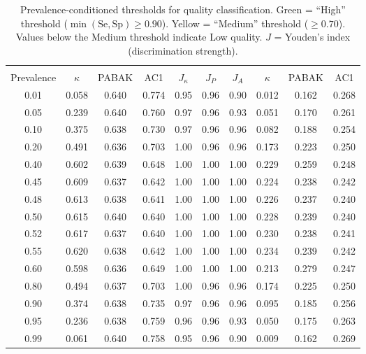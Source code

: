 
\begin{table}[h!]
\centering
\caption{Prevalence-conditioned thresholds for quality classification. \colorbox{green!15}{Green} = ``High'' threshold ($\min(\text{Se}, \text{Sp}) \geq 0.90$). \colorbox{yellow!25}{Yellow} = ``Medium'' threshold ($\geq 0.70$). Values below the Medium threshold indicate Low quality. $J$ = Youden's index (discrimination strength).}
\label{tab:thresholds}
\small
\begin{tabular}{c >{\columncolor{green!10}}c c >{\columncolor{green!10}}c c >{\columncolor{green!10}}c c >{\columncolor{yellow!15}}c >{\columncolor{yellow!15}}c >{\columncolor{yellow!15}}c}
\toprule
 & \multicolumn{3}{c}{High threshold} & \multicolumn{3}{c}{} & \multicolumn{3}{c}{Medium threshold} \\
\cmidrule(lr){2-4} \cmidrule(lr){8-10}
Prevalence & $\kappa$ & PABAK & AC1 & $J_\kappa$ & $J_P$ & $J_A$ & $\kappa$ & PABAK & AC1 \\
\midrule
0.01 & 0.058 & 0.640 & 0.774 & 0.95 & 0.96 & 0.90 & 0.012 & 0.162 & 0.268 \\
0.05 & 0.239 & 0.640 & 0.760 & 0.97 & 0.96 & 0.93 & 0.051 & 0.170 & 0.261 \\
0.10 & 0.375 & 0.638 & 0.730 & 0.97 & 0.96 & 0.96 & 0.082 & 0.188 & 0.254 \\
0.20 & 0.491 & 0.636 & 0.703 & 1.00 & 0.96 & 0.96 & 0.173 & 0.223 & 0.250 \\
0.40 & 0.602 & 0.639 & 0.648 & 1.00 & 1.00 & 1.00 & 0.229 & 0.259 & 0.248 \\
0.45 & 0.609 & 0.637 & 0.642 & 1.00 & 1.00 & 1.00 & 0.224 & 0.238 & 0.242 \\
0.48 & 0.613 & 0.638 & 0.641 & 1.00 & 1.00 & 1.00 & 0.226 & 0.237 & 0.240 \\
0.50 & 0.615 & 0.640 & 0.640 & 1.00 & 1.00 & 1.00 & 0.228 & 0.239 & 0.240 \\
0.52 & 0.617 & 0.637 & 0.640 & 1.00 & 1.00 & 1.00 & 0.230 & 0.238 & 0.241 \\
0.55 & 0.620 & 0.638 & 0.642 & 1.00 & 1.00 & 1.00 & 0.234 & 0.239 & 0.242 \\
0.60 & 0.598 & 0.636 & 0.649 & 1.00 & 1.00 & 1.00 & 0.213 & 0.279 & 0.247 \\
0.80 & 0.494 & 0.637 & 0.703 & 1.00 & 0.96 & 0.96 & 0.174 & 0.225 & 0.250 \\
0.90 & 0.374 & 0.638 & 0.735 & 0.97 & 0.96 & 0.96 & 0.095 & 0.185 & 0.256 \\
0.95 & 0.236 & 0.638 & 0.759 & 0.96 & 0.96 & 0.93 & 0.050 & 0.175 & 0.263 \\
0.99 & 0.061 & 0.640 & 0.758 & 0.95 & 0.96 & 0.90 & 0.009 & 0.162 & 0.269 \\
\bottomrule
\end{tabular}
\end{table}
